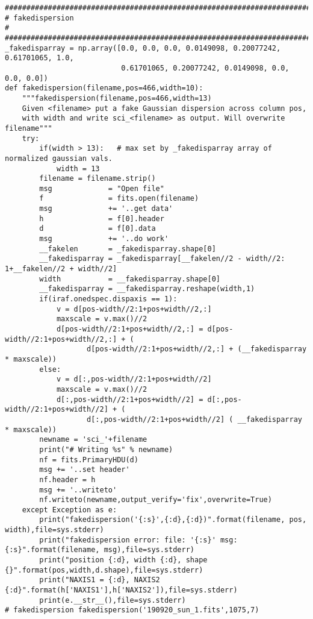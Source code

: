 {\begin{verbatim}
##############################################################################
# fakedispersion
#
##############################################################################
_fakedisparray = np.array([0.0, 0.0, 0.0, 0.0149098, 0.20077242, 0.61701065, 1.0,
                           0.61701065, 0.20077242, 0.0149098, 0.0, 0.0, 0.0])
def fakedispersion(filename,pos=466,width=10):
    """fakedispersion(filename,pos=466,width=13)
    Given <filename> put a fake Gaussian dispersion across column pos,
    with width and write sci_<filename> as output. Will overwrite filename"""
    try:
        if(width > 13):   # max set by _fakedisparray array of normalized gaussian vals.
            width = 13
        filename = filename.strip()
        msg             = "Open file"
        f               = fits.open(filename)
        msg             += '..get data'
        h               = f[0].header
        d               = f[0].data
        msg             += '..do work'
        __fakelen       = _fakedisparray.shape[0]
        __fakedisparray = _fakedisparray[__fakelen//2 - width//2: 1+__fakelen//2 + width//2]
        width           = __fakedisparray.shape[0]
        __fakedisparray = __fakedisparray.reshape(width,1)
        if(iraf.onedspec.dispaxis == 1):
            v = d[pos-width//2:1+pos+width//2,:]
            maxscale = v.max()//2
            d[pos-width//2:1+pos+width//2,:] = d[pos-width//2:1+pos+width//2,:] + (
                   d[pos-width//2:1+pos+width//2,:] + (__fakedisparray * maxscale))
        else:
            v = d[:,pos-width//2:1+pos+width//2]
            maxscale = v.max()//2
            d[:,pos-width//2:1+pos+width//2] = d[:,pos-width//2:1+pos+width//2] + (
                   d[:,pos-width//2:1+pos+width//2] ( __fakedisparray * maxscale))
        newname = 'sci_'+filename
        print("# Writing %s" % newname)
        nf = fits.PrimaryHDU(d)
        msg += '..set header'
        nf.header = h
        msg += '..writeto'
        nf.writeto(newname,output_verify='fix',overwrite=True)
    except Exception as e:
        print("fakedispersion('{:s}',{:d},{:d})".format(filename, pos, width),file=sys.stderr)
        print("fakedispersion error: file: '{:s}' msg: {:s}".format(filename, msg),file=sys.stderr)
        print("position {:d}, width {:d}, shape {}".format(pos,width,d.shape),file=sys.stderr)
        print("NAXIS1 = {:d}, NAXIS2 {:d}".format(h['NAXIS1'],h['NAXIS2']),file=sys.stderr)
        print(e.__str__(),file=sys.stderr)
# fakedispersion fakedispersion('190920_sun_1.fits',1075,7)


\end{verbatim}}
